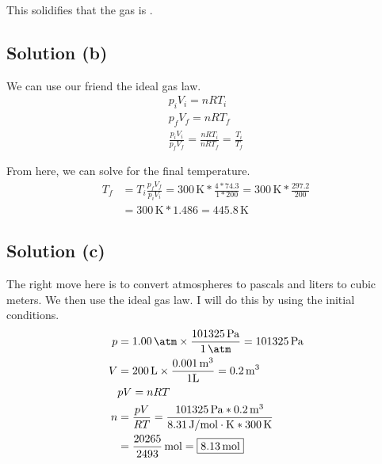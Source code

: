 \documentclass[12pt]{article}
\begin{document}
            This solidifies that the gas is .

        \subsection{Solution (b)}
            We can use our friend the ideal gas law.
            \begin{gather}
                p_i V_i =   nR T_i\\
                p_f V_f =   nR T_f\\
                \frac{p_i V_i}{p_f V_f} =   \frac{nR T_i}{nR T_f}   =   \frac{T_i}{T_f}
            \end{gather}

            From here, we can solve for the final temperature.
            \begin{align}
                T_f &=  T_i \frac{p_f V_f}{p_i V_i}
                    =   300\,\unit{\kelvin} * \frac{4 * 74.3}{1 * 200}
                    =   300\,\unit{\kelvin} * \frac{297.2}{200}\\
                    &=  300\,\unit{\kelvin} * 1.486
                    =   \boxed{445.8\,\unit{\kelvin}}
            \end{align}

        \subsection{Solution (c)}
            The right move here is to convert atmospheres to pascals and liters to cubic meters.
            We then use the ideal gas law.
            I will do this by using the initial conditions.
            \begin{align}
                p   &=  1.00\,\unit{\atm} \times \frac{101325\,\unit{\pascal}}{1\,\unit{\atm}}
                    =   101325\,\unit{\pascal}\\
                V   &=  200\,\unit{\liter} \times \frac{0.001\,\unit{\meter^3}}{1\unit{\liter}}
                    =   0.2\,\unit{\meter^3}\\
                &pV =   nRT\\
                n   &=  \frac{pV}{RT}
                    =   \frac{101325\,\unit{\pascal} * 0.2\,\unit{\meter^3}}{8.31\,\unit{\joule/\mole\cdot\kelvin} * 300\,\unit{\kelvin}}\\
                    &=  \frac{20265}{2493}\,\unit{\mole}
                    =   \boxed{8.13\,\unit{\mole}}
            \end{align}
\end{document}
